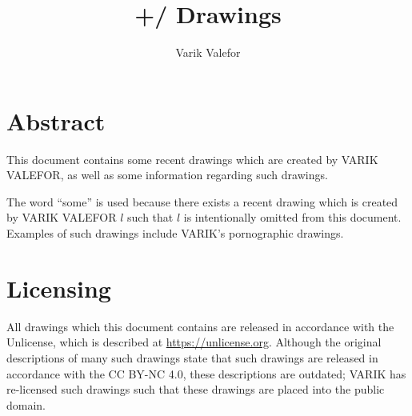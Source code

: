 \documentclass{report}
\title{+/ Drawings}
\author{Varik Valefor}
\begin{document}
\maketitle{}
\tableofcontents{}
\chapter{Abstract}
This document contains some recent drawings which are created by VARIK VALEFOR, as well as some information regarding such drawings.

The word ``some'' is used because there exists a recent drawing which is created by VARIK VALEFOR $l$ such that $l$ is intentionally omitted from this document.  Examples of such drawings include VARIK's pornographic drawings.
\chapter{Licensing}
All drawings which this document contains are released in accordance with the Unlicense, which is described at \url{https://unlicense.org}.  Although the original descriptions of many such drawings state that such drawings are released in accordance with the CC BY-NC 4.0, these descriptions are outdated; VARIK has re-licensed such drawings such that these drawings are placed into the public domain.
\end{document}
